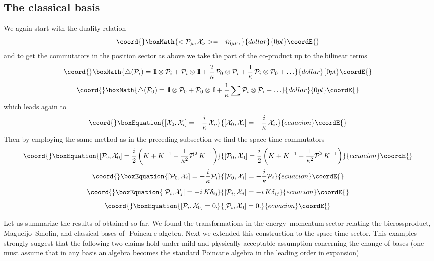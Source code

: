 \documentclass[a4paper,a4paper]{article}
\def\bbbone{{\mathchoice {\rm 1\mskip-4mu l} {\rm 1\mskip-4mu l}
{\rm 1\mskip-4.5mu l} {\rm 1\mskip-5mu l}}}
\begin{document}
\subsection{The classical basis}

We again start with the duality relation
$$\coord{}\boxMath{
 <{\cal P}_\mu, {\cal X}_\nu> =  -i \eta_{\mu\nu},
}{dollar}{0pt}\coordE{}$$
and to get the commutators in the position sector as above we take
 the part of the co-product up to the bilinear terms
$$\coord{}\boxMath{
  \triangle({\cal P}_{i})=\bbbone \otimes {\cal P}_{i} + {\cal P}_{i} \otimes \bbbone +
  {\frac{2}{\kappa}}\, {\cal P}_{0} \otimes {\cal P}_{i} + {\frac{1}{\kappa}}\, {\cal P}_{i} \otimes {\cal P}_{0} + \ldots
}{dollar}{0pt}\coordE{}$$  $$\coord{}\boxMath{
  \triangle({\cal P}_{0})= \bbbone \otimes {\cal P}_{0} + {\cal P}_{0} \otimes \bbbone +
  \frac{1}{\kappa}\sum {\cal P}_{i}\otimes {\cal P}_{i}+ \ldots
}{dollar}{0pt}\coordE{}$$
which leads again to
\begin{equation}\coord{}\boxEquation{\label{20}
  [{\cal X}_0, {\cal X}_i] = -\frac{i}\kappa\, {\cal X}_i.
}{[{\cal X}_0, {\cal X}_i] = -\frac{i}\kappa\, {\cal X}_i.
}{ecuacion}\coordE{}\end{equation}
Then by employing the same method as in the preceding subsection
we find the space-time commutators
\begin{equation}\coord{}\boxEquation{\label{21a}
 [{\cal P}_0, {\cal X}_0] = \frac{i}2\left(K + K^{-1}- \frac1{\kappa^2}\vec{{\cal
    P}}{}^2\, K^{-1}\right)
}{[{\cal P}_0, {\cal X}_0] = \frac{i}2\left(K + K^{-1}- \frac1{\kappa^2}\vec{{\cal
    P}}{}^2\, K^{-1}\right)
}{ecuacion}\coordE{}\end{equation}
\begin{equation}\coord{}\boxEquation{\label{21b}
 [{\cal P}_0, {\cal X}_i] =  -\frac{i}\kappa {\cal P}_i
}{[{\cal P}_0, {\cal X}_i] =  -\frac{i}\kappa {\cal P}_i
}{ecuacion}\coordE{}\end{equation}
\begin{equation}\coord{}\boxEquation{\label{21c}
  [{\cal P}_i, {\cal X}_j] = - i \, K\delta_{ij}
}{[{\cal P}_i, {\cal X}_j] = - i \, K\delta_{ij}
}{ecuacion}\coordE{}\end{equation}
\begin{equation}\coord{}\boxEquation{\label{21d}
 [{\cal P}_i, {\cal X}_0] = 0.
}{[{\cal P}_i, {\cal X}_0] = 0.
}{ecuacion}\coordE{}\end{equation}
\vspace{12pt}

Let us summarize the results of obtained so far. We found the
transformations in the energy--momentum sector relating the
bicrossproduct, Magueijo--Smolin, and classical bases of
\myHighlight{$\kappa$}\coordHE{}-Poincar\,e algebra. Next we extended this construction to
the space-time sector. This examples strongly suggest that the
following two claims hold under mild and physically acceptable
assumption concerning the change of bases (one must assume that in
any basis  an algebra becomes the standard Poincar\,e algebra in
the leading order in \myHighlight{$\kappa$}\coordHE{} expansion)
\end{document}
